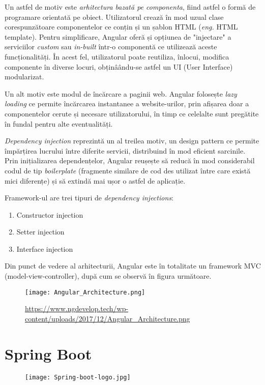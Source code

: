 Un astfel de motiv este \textit{arhitectura bazată pe componenta}, fiind astfel o formă de programare orientată pe obiect. Utilizatorul crează în mod uzual clase corespunzătoare componentelor ce conțin și un șablon HTML (\textit{eng.} HTML template). Pentru simplificare, Angular oferă și opțiunea de "injectare" a serviciilor \textit{custom} sau \textit{in-built} într-o componentă ce utilizează aceste funcționalități. În acest fel, utilizatorul poate reutiliza, înlocui, modifica componente în diverse locuri, obținâându-se astfel un UI (User Interface) modularizat.

Un alt motiv este modul de încărcare a paginii web. Angular folosește \textit{lazy loading} ce permite încărcarea instantanee a website-urilor, prin afișarea doar a componentelor cerute și necesare utilizatorului, în timp ce celelalte sunt pregătite în fundal pentru alte eventualități.

\textit{Dependency injection} reprezintă un al treilea motiv, un design pattern ce permite împărțirea lucrului între diferite servicii, distribuind în mod eficient sarcinile. Prin inițializarea dependențelor, Angular reușește să reducă în mod considerabil codul de tip \textit{boilerplate} (fragmente similare de cod des utilizat între care există mici diferențe) și să extindă mai ușor o astfel de aplicație.

Framework-ul are trei tipuri de \textit{dependency injections}:
\begin{enumerate}
	\item Constructor injection
	\item Setter injection
	\item Interface injection
\end{enumerate}

Din punct de vedere al arhitecturii, Angular este în totalitate un framework MVC (model-view-controller), după cum se observă în figura următoare.

\begin{figure}[H]
	\centering
	\texttt{[image: Angular\_Architecture.png]}
	\caption{\url{https://www.ngdevelop.tech/wp-content/uploads/2017/12/Angular_Architecture.png}}
\end{figure}

\section{Spring Boot}
\begin{figure}[H]
	\centering
	\texttt{[image: Spring-boot-logo.jpg]}
\end{figure}

